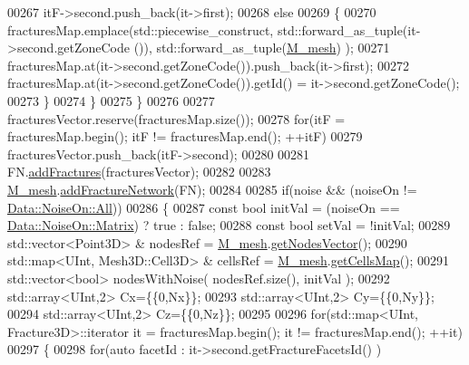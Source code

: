 \begin{DoxyCode}
00267                 itF->second.push\_back(it->first);
00268             \textcolor{keywordflow}{else}
00269             \{
00270                 fracturesMap.emplace(std::piecewise\_construct, std::forward\_as\_tuple(it->second.getZoneCode
      ()), std::forward\_as\_tuple(\hyperlink{classFVCode3D_1_1CartesianGrid_a40c64e663b3d2de02b852403c75495fb}{M\_mesh}) );
00271                 fracturesMap.at(it->second.getZoneCode()).push\_back(it->first);
00272                 fracturesMap.at(it->second.getZoneCode()).getId() = it->second.getZoneCode();
00273             \}
00274         \}
00275     \}
00276 
00277     fracturesVector.reserve(fracturesMap.size());
00278     \textcolor{keywordflow}{for}(itF = fracturesMap.begin();  itF != fracturesMap.end(); ++itF)
00279         fracturesVector.push\_back(itF->second);
00280 
00281     FN.\hyperlink{classFVCode3D_1_1FractureNetwork3D_a1d1ae862d9076988686cef213dc0574d}{addFractures}(fracturesVector);
00282 
00283     \hyperlink{classFVCode3D_1_1CartesianGrid_a40c64e663b3d2de02b852403c75495fb}{M\_mesh}.\hyperlink{classFVCode3D_1_1Mesh3D_a269c01796091da2f599e66b6b91b39dd}{addFractureNetwork}(FN);
00284 
00285     \textcolor{keywordflow}{if}(noise && (noiseOn != \hyperlink{classFVCode3D_1_1Data_a983fdc14aa355a7c9fd614b9655a3552ab1c94ca2fbc3e78fc30069c8d0f01680}{Data::NoiseOn::All}))
00286     \{
00287         \textcolor{keyword}{const} \textcolor{keywordtype}{bool} initVal = (noiseOn == \hyperlink{classFVCode3D_1_1Data_a983fdc14aa355a7c9fd614b9655a3552af53df0293e169f562bc1d9a20e1d2589}{Data::NoiseOn::Matrix}) ? \textcolor{keyword}{true} : \textcolor{keyword}{false};
00288         \textcolor{keyword}{const} \textcolor{keywordtype}{bool} setVal = !initVal;
00289         std::vector<Point3D> & nodesRef = \hyperlink{classFVCode3D_1_1CartesianGrid_a40c64e663b3d2de02b852403c75495fb}{M\_mesh}.\hyperlink{classFVCode3D_1_1Mesh3D_a04162ec60e0fe52674b3ecbb7de1185c}{getNodesVector}();
00290         std::map<UInt, Mesh3D::Cell3D> & cellsRef = \hyperlink{classFVCode3D_1_1CartesianGrid_a40c64e663b3d2de02b852403c75495fb}{M\_mesh}.\hyperlink{classFVCode3D_1_1Mesh3D_ad904ef5e068c89951d77e9364e960bf3}{getCellsMap}();
00291         std::vector<bool> nodesWithNoise( nodesRef.size(), initVal );
00292         std::array<UInt,2> Cx=\{\{0,Nx\}\};
00293         std::array<UInt,2> Cy=\{\{0,Ny\}\};
00294         std::array<UInt,2> Cz=\{\{0,Nz\}\};
00295 
00296         \textcolor{keywordflow}{for}(std::map<UInt, Fracture3D>::iterator it = fracturesMap.begin(); it != fracturesMap.end(); ++it)
00297         \{
00298             \textcolor{keywordflow}{for}(\textcolor{keyword}{auto} facetId : it->second.getFractureFacetsId() )

\end{DoxyCode}
